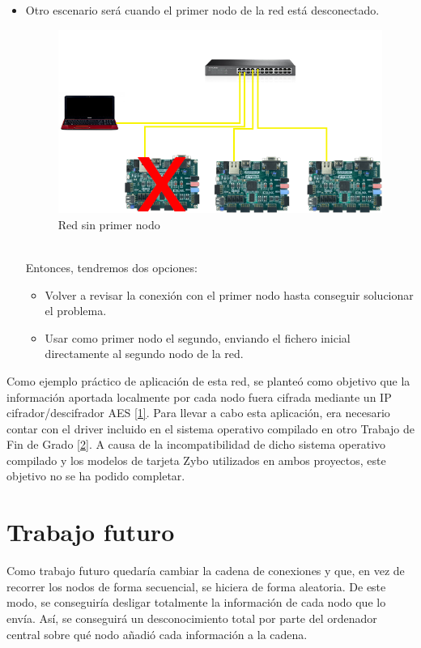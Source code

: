 \begin{itemize}
\begin{figure}[h]
	\end{figure}
	\item Otro escenario será cuando el primer nodo de la red está desconectado.
	\begin{figure}[h]
		\centering
		\includegraphics[scale=0.5]{Epilogo/RedSinNodo1.png}
		\caption{Red sin primer nodo}
		\label{Red sin primer nodo}
	\end{figure}\\
	Entonces, tendremos dos opciones:
	\begin{itemize}
		\item Volver a revisar la conexión con el primer nodo hasta conseguir solucionar el problema.
		\item Usar como primer nodo el segundo, enviando el fichero inicial directamente al segundo nodo de la red.
	\end{itemize}
\end{itemize}

Como ejemplo práctico de aplicación de esta red, se planteó como objetivo que la información aportada localmente por cada nodo fuera cifrada mediante un IP cifrador/descifrador AES \hyperlink{1}{[1]}. Para llevar a cabo esta aplicación, era necesario contar con el driver incluido en el sistema operativo compilado en otro Trabajo de Fin de Grado \hyperlink{2}{[2]}. A causa de la incompatibilidad de dicho sistema operativo compilado y los modelos de tarjeta Zybo utilizados en ambos proyectos, este objetivo no se ha podido completar.

\section{Trabajo futuro}
Como trabajo futuro quedaría cambiar la cadena de conexiones y que, en vez de recorrer los nodos de forma secuencial, se hiciera de forma aleatoria. De este modo, se conseguiría desligar totalmente la información de cada nodo que lo envía. Así, se conseguirá un desconocimiento total por parte del ordenador central sobre qué nodo añadió cada información a la cadena.

